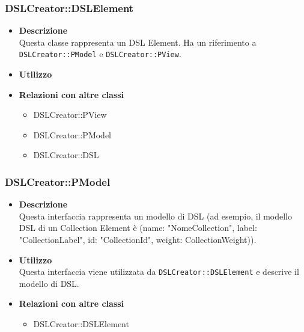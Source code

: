         \subsubsection{DSLCreator::DSLElement}
        \begin{itemize}
        \item \textbf{Descrizione} \hfill \\
          Questa classe rappresenta un DSL Element. Ha un riferimento a \texttt{DSLCreator::PModel} e \texttt{DSLCreator::PView}.
        \item \textbf{Utilizzo}  \hfill \\
        \item \textbf{Relazioni con altre classi} \hfill 
          \begin{itemize}
          \item DSLCreator::PView
          \item DSLCreator::PModel
          \item DSLCreator::DSL
          \end{itemize}
        \end{itemize}

        \subsubsection{DSLCreator::PModel}
        \begin{itemize}
        \item \textbf{Descrizione} \hfill \\
          Questa interfaccia rappresenta un modello di DSL (ad esempio, il modello DSL di un Collection Element \`{e} (name: "NomeCollection", label: "CollectionLabel", id: "CollectionId", weight: CollectionWeight)).
        \item \textbf{Utilizzo}  \hfill \\
          Questa interfaccia viene utilizzata da \texttt{DSLCreator::DSLElement} e descrive il modello di DSL.
        \item \textbf{Relazioni con altre classi} \hfill 
          \begin{itemize}
          \item DSLCreator::DSLElement
          \end{itemize}
        \end{itemize}

